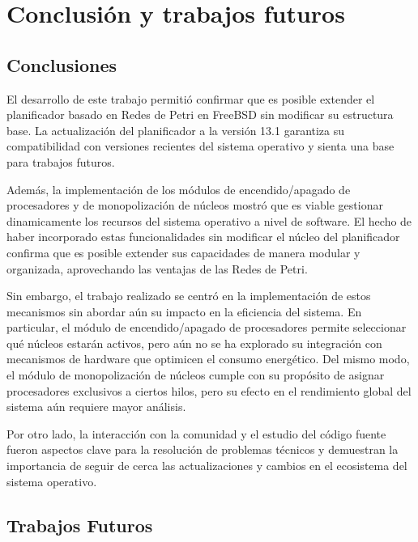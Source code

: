 \chapter{Conclusión y trabajos futuros}

\section{Conclusiones}

El desarrollo de este trabajo permitió confirmar que es posible extender el planificador basado en Redes de Petri en FreeBSD sin modificar su estructura base. La actualización del planificador a la versión 13.1 garantiza su compatibilidad con versiones recientes del sistema operativo y sienta una base para trabajos futuros.\par

Además, la implementación de los módulos de encendido/apagado de procesadores y de monopolización de núcleos mostró que es viable gestionar dinamicamente los recursos del sistema operativo a nivel de software. El hecho de haber incorporado estas funcionalidades sin modificar el núcleo del planificador confirma que es posible extender sus capacidades de manera modular y organizada, aprovechando las ventajas de las Redes de Petri.\par

Sin embargo, el trabajo realizado se centró en la implementación de estos mecanismos sin abordar aún su impacto en la eficiencia del sistema. En particular, el módulo de encendido/apagado de procesadores permite seleccionar qué núcleos estarán activos, pero aún no se ha explorado su integración con mecanismos de hardware que optimicen el consumo energético. Del mismo modo, el módulo de monopolización de núcleos cumple con su propósito de asignar procesadores exclusivos a ciertos hilos, pero su efecto en el rendimiento global del sistema aún requiere mayor análisis.\par

Por otro lado, la interacción con la comunidad y el estudio del código fuente fueron aspectos clave para la resolución de problemas técnicos y demuestran la importancia de seguir de cerca las actualizaciones y cambios en el ecosistema del sistema operativo.\par

\section{Trabajos Futuros}

